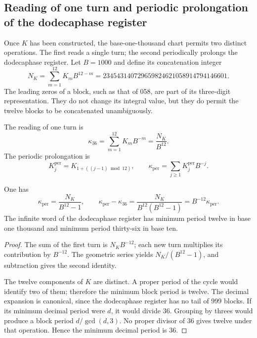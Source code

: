 \subsection{Reading of one turn and periodic prolongation of the dodecaphase register}
\label{subsec:k-kappas}

Once \(K\) has been constructed, the base-one-thousand chart permits two
distinct operations. The first reads a single turn; the second periodically
prolongs the dodecaphase register. Let \(B=1000\) and define its concatenation integer
\begin{equation}
 N_K=\sum_{m=1}^{12}K_mB^{12-m}
 =234543140729659824621058914794146601.
 \label{eq:k-numerador}
\end{equation}
The leading zeros of a block, such as that of 058, are part of its three-digit
representation. They do not change its integral value, but they do permit the
twelve blocks to be concatenated unambiguously.

\begin{definition}
\label{def:k-kappas}
The reading of one turn is
\[
 \kappa_{36}=\sum_{m=1}^{12}K_mB^{-m}=\frac{N_K}{B^{12}}.
\]
The periodic prolongation is
\[
 K_j^{\mathrm{per}}=K_{1+((j-1)\bmod12)},\qquad
 \kappa_{\mathrm{per}}=\sum_{j\geq1}K_j^{\mathrm{per}}B^{-j}.
\]
\end{definition}

\begin{proposition}
\label{prop:k-periodo}
One has
\begin{equation}
 \kappa_{\mathrm{per}}=\frac{N_K}{B^{12}-1},\qquad
 \kappa_{\mathrm{per}}-\kappa_{36}
 =\frac{N_K}{B^{12}(B^{12}-1)}
 =B^{-12}\kappa_{\mathrm{per}}.
 \label{eq:k-diferencia-kappas}
\end{equation}
The infinite word of the dodecaphase register has minimum period twelve in base
one thousand and minimum period thirty-six in base ten.
\end{proposition}

\begin{proof}
The sum of the first turn is \(N_KB^{-12}\); each new turn multiplies its
contribution by \(B^{-12}\). The geometric series yields \(N_K/(B^{12}-1)\),
and subtraction gives the second identity.

The twelve components of \(K\) are distinct. A proper period of the cycle
would identify two of them; therefore the minimum block period is twelve. The
decimal expansion is canonical, since the dodecaphase register has no tail of
999 blocks. If its minimum decimal period were \(d\), it would divide 36.
Grouping by threes would produce a block period \(d/\gcd(d,3)\). No proper
divisor of 36 gives twelve under that operation. Hence the minimum decimal
period is 36.
\end{proof}


